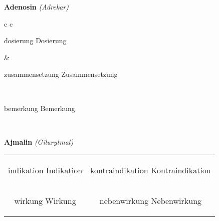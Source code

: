 \documentclass[12pt]{beamer}
\begin{document}
\begin{frame}{
    \textbf{Adenosin}
    \textit{(Adrekar)}
}
    \begin{tabular}{c c}
        \begin{beamercolorbox}[wd=\boxwidth\textwidth,ht=\boxheight\textheight,sep=1em]{dosierung}
        Dosierung
        \end{beamercolorbox} & 
        \begin{beamercolorbox}[wd=\boxwidth\textwidth,ht=\boxheight\textheight,sep=1em]{zusammensetzung}
        Zusammensetzung
        \end{beamercolorbox} \\
        \begin{beamercolorbox}[wd=\textwidth,ht=\boxheight\textheight,sep=1em]{bemerkung}
        Bemerkung
        \end{beamercolorbox} \\
    \end{tabular}
\end{frame}

\begin{frame}{
    \textbf{Ajmalin}
    \textit{(Gilurytmal)}
}
    \begin{tabular}{c c}
        \begin{beamercolorbox}[wd=\boxwidth\textwidth,ht=\boxheight\textheight,sep=1em]{indikation}
        Indikation
        \end{beamercolorbox} & 
        \begin{beamercolorbox}[wd=\boxwidth\textwidth,ht=\boxheight\textheight,sep=1em]{kontraindikation}
        Kontraindikation 
        \end{beamercolorbox} \\
        \begin{beamercolorbox}[wd=\boxwidth\textwidth,ht=\boxheight\textheight,sep=1em]{wirkung}
        Wirkung
        \end{beamercolorbox} & 
        \begin{beamercolorbox}[wd=\boxwidth\textwidth,ht=\boxheight\textheight,sep=1em]{nebenwirkung}
        Nebenwirkung
        \end{beamercolorbox} \\
    \end{tabular}
\end{frame}
\end{document}
